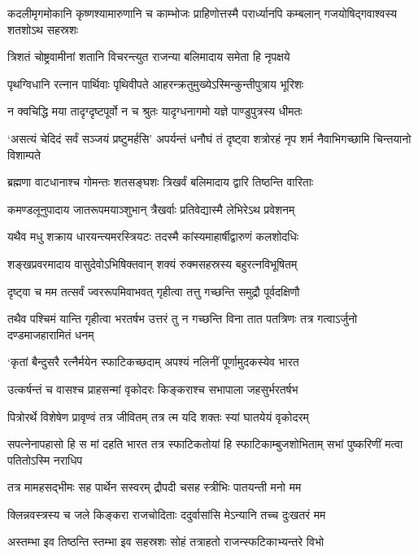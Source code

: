 \threelineshloka
{कदलीमृगमोकानि कृष्णश्यामारुणानि च}
{काम्भोजः प्राहिणोत्तस्मै परार्ध्यानपि कम्बलान्}
{गजयोषिद्गवाश्वस्य शतशोऽथ सहस्रशः}


\twolineshloka
{त्रिशतं चोष्ट्रवामीनां शतानि विचरन्त्युत}
{राजन्या बलिमादाय समेता हि नृपक्षये}


\twolineshloka
{पृथग्विधानि रत्नान पार्थिवाः पृथिवीपते}
{आहरन्क्रतुमुख्येऽस्मिन्कुन्तीपुत्राय भूरिशः}


\twolineshloka
{न क्वचिद्धि मया तादृग्दृष्टपूर्वो न च श्रुतः}
{यादृग्धनागमो यज्ञे पाण्डुपुत्रस्य धीमतः}


\threelineshloka
{`असत्यं चेदिदं सर्वं सञ्जयं प्रष्टुमर्हसि'}
{अपर्यन्तं धनौघं तं दृष्ट्वा शत्रोरहं नृप}
{शर्म नैवाभिगच्छामि चिन्तयानो विशाम्पते}


\twolineshloka
{ब्रह्मणा वाटधानाश्च गोमन्तः शतसङ्घशः}
{त्रिखर्वं बलिमादाय द्वारि तिष्ठन्ति वारिताः}


\twolineshloka
{कमण्डलूनुपादाय जातरूपमयाञ्शुभान्}
{त्रैखर्वाः प्रतिवेद्यास्मै लेभिरेऽथ प्रवेशनम्}


\twolineshloka
{यथैव मधु शक्राय धारयन्त्यमरस्त्रियटः}
{तदस्मै कांस्यमाहार्षीद्वारुणं कलशोदधिः}


\twolineshloka
{शङ्खप्रवरमादाय वासुदेवोऽभिषिक्तवान्}
{शक्यं रुक्मसहस्रस्य बहुरत्नविभूषितम्}


\twolineshloka
{दृष्ट्वा च मम तत्सर्वं ज्वररूपमिवाभवत्}
{गृहीत्वा तत्तु गच्छन्ति समुद्रौ पूर्वदक्षिणौ}


\threelineshloka
{तथैव पश्चिमं यान्ति गृहीत्वा भरतर्षभ}
{उत्तरं तु न गच्छन्ति विना तात पतत्रिणः}
{तत्र गत्वाऽर्जुनो दण्डमाजहारामितं धनम्}


\twolineshloka
{`कृतां बैन्दुसरै रत्नैर्मयेन स्फाटिकच्छदाम्}
{अपश्यं नलिनीं पूर्णामुदकस्येव भारत}


\twolineshloka
{उत्कर्षन्तं च वासश्च प्राहसन्मां वृकोदरः}
{किङ्कराश्च सभापाला जहसुर्भरतर्षभ}


\twolineshloka
{पित्रोरर्थे विशेषेण प्रावृण्वं तत्र जीवितम्}
{तत्र त्म यदि शक्तः स्यां घातयेयं वृकोदरम्}


सपत्नेनापहासो हि स मां दहति भारत
\twolineshloka
{तत्र स्फाटिकतोयां हि स्फाटिकाम्बुजशोभिताम्}
{सभां पुष्करिणीं मत्वा पतितोऽस्मि नराधिप}


\twolineshloka
{तत्र मामहसद्भीमः सह पार्थेन सस्वरम्}
{द्रौपदी चसह स्त्रीभिः पातयन्ती मनो मम}


\twolineshloka
{क्लिन्नवस्त्रस्य च जले किङ्करा राजचोदिताः}
{ददुर्वासांसि मेऽन्यानि तच्च दुःखतरं मम}


\twolineshloka
{अस्तम्भा इव तिष्ठन्ति स्तम्भा इव सहस्रशः}
{सोहं तत्राहतो राजन्स्फटिकाभ्यन्तरे विभो}


